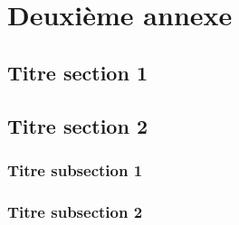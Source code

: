 \chapter{Deuxième annexe}
\label{annexe:two}

\fancyhead[LE]{\textsc{\chaptername~\thechapter}}

\section{Titre section 1}

\lipsum[4] 

\lipsum[5] 

\section{Titre section 2}

\lipsum[6]

\subsection{Titre subsection 1}

\lipsum[7]

\lipsum[8]

\lipsum[13]

\subsection{Titre subsection 2}

\lipsum[9]

\lipsum[10]

\lipsum[12]
